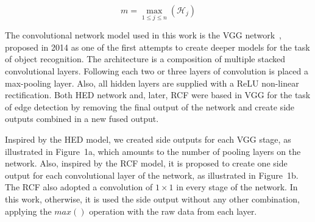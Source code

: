 \begin{equation}
m = \max_{1 \leq j \leq n} (\mathcal{H}_j)
\label{eq:max_operation}
\end{equation}

The convolutional network model used in this work is the VGG network~\cite{simonyan2014}, proposed in 2014 as one of the first attempts to create deeper models for the task of object recognition. The architecture is a composition of multiple stacked convolutional layers. Following each two or three layers of convolution is placed a max-pooling layer. Also, all hidden layers are supplied with a ReLU non-linear rectification. Both HED network \cite{Xie:2017:HED:3158436.3158453} and, later, RCF \cite{RCF:8100105} were based in VGG for the task of edge detection by removing the final output of the network and create side outputs combined in a new fused output. 

Inspired by the HED model, we created side outputs for each VGG stage, as illustrated in Figure~1a, which amounts to the number of pooling layers on the network. Also, inspired by the RCF model, it is proposed to create one side output for each convolutional layer of the network, as illustrated in Figure~1b. The RCF also adopted a convolution of $1\times1$ in every stage of the network. In this work, otherwise, it is used the side output without any other combination, applying the $max()$ operation with the raw data from each layer.    


